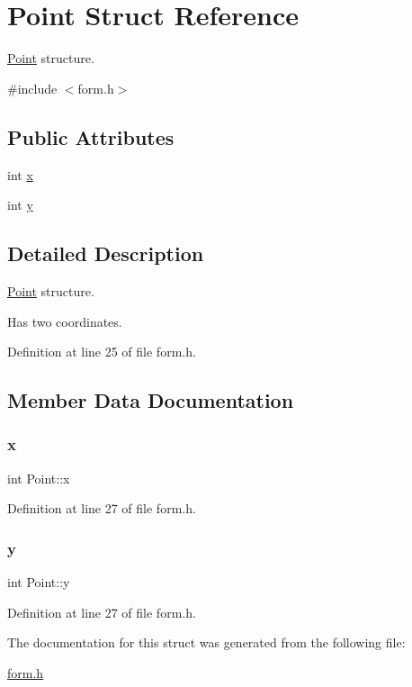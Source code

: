 \hypertarget{struct_point}{}\section{Point Struct Reference}
\label{struct_point}


\hyperlink{struct_point}{Point} structure.  




{\ttfamily \#include $<$form.\+h$>$}

\subsection*{Public Attributes}
\begin{DoxyCompactItemize}
\item 
int \hyperlink{struct_point_a8c779e11e694b20e0946105a9f5de842}{x}
\item 
int \hyperlink{struct_point_a2e1b5fb2b2a83571f5c0bc0f66a73cf7}{y}
\end{DoxyCompactItemize}


\subsection{Detailed Description}
\hyperlink{struct_point}{Point} structure. 

Has two coordinates. 

Definition at line 25 of file form.\+h.



\subsection{Member Data Documentation}
\hypertarget{struct_point_a8c779e11e694b20e0946105a9f5de842}{}\label{struct_point_a8c779e11e694b20e0946105a9f5de842} 
\subsubsection{\texorpdfstring{x}{x}}
{\footnotesize\ttfamily int Point\+::x}



Definition at line 27 of file form.\+h.

\hypertarget{struct_point_a2e1b5fb2b2a83571f5c0bc0f66a73cf7}{}\label{struct_point_a2e1b5fb2b2a83571f5c0bc0f66a73cf7} 
\subsubsection{\texorpdfstring{y}{y}}
{\footnotesize\ttfamily int Point\+::y}



Definition at line 27 of file form.\+h.



The documentation for this struct was generated from the following file\+:\begin{DoxyCompactItemize}
\item 
\hyperlink{form_8h}{form.\+h}\end{DoxyCompactItemize}
